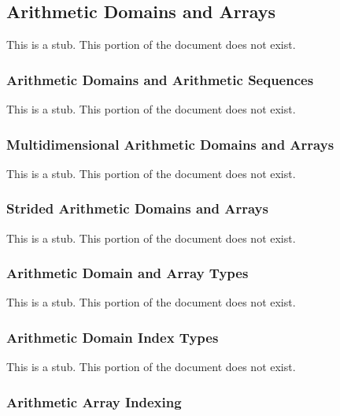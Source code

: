 \subsection{Arithmetic Domains and Arrays}
\label{Arithmetic_Domains_and_Arrays}

This is a stub.  This portion of the document does not exist.

\subsubsection{Arithmetic Domains and Arithmetic Sequences}
\label{Arithmetic_Domains_and_Arithmetic_Sequences}

This is a stub.  This portion of the document does not exist.

\subsubsection{Multidimensional Arithmetic Domains and Arrays}
\label{Multidimensional_Arithmetic_Domains_and_Arrays}

This is a stub.  This portion of the document does not exist.

\subsubsection{Strided Arithmetic Domains and Arrays}
\label{Strided_Arithmetic_Domains_and_Arrays}

This is a stub.  This portion of the document does not exist.

\subsubsection{Arithmetic Domain and Array Types}
\label{Arithmetic_Domain_and_Array_Types}

This is a stub.  This portion of the document does not exist.

\subsubsection{Arithmetic Domain Index Types}
\label{Arithmetic_Domain_Index_Types}

This is a stub.  This portion of the document does not exist.

\subsubsection{Arithmetic Array Indexing}
\label{Arithmetic_Array_Indexing}

